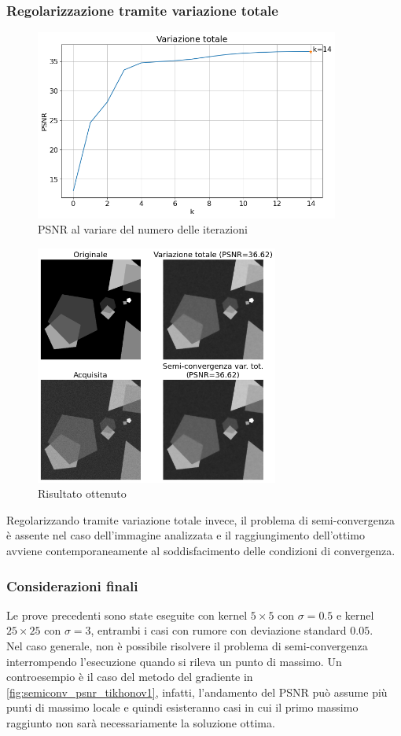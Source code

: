 \documentclass[11pt]{article}
\begin{document}
\subsubsection{Regolarizzazione tramite variazione totale}
\begin{figure}[H]
    \centering
    \includegraphics[width=10cm]{semiconvergenza/1/psnr_tv.png}
    \caption{PSNR al variare del numero delle iterazioni}
    \label{fig:semiconv_psnr_tv1}
\end{figure}
\begin{figure}[H]
    \centering
    \includegraphics[width=8cm]{semiconvergenza/1/deblur_tv.png}
    \caption{Risultato ottenuto}
    \label{fig:semiconv_deblur_tv1}
\end{figure}
Regolarizzando tramite variazione totale invece, il problema di semi-convergenza è assente nel caso dell'immagine analizzata e il raggiungimento dell'ottimo avviene contemporaneamente al soddisfacimento delle condizioni di convergenza.

\subsubsection{Considerazioni finali}
Le prove precedenti sono state eseguite con kernel $5 \times 5$ con $\sigma=0.5$ e kernel $25 \times 25$ con $\sigma=3$, entrambi i casi con rumore con deviazione standard $0.05$.\\
Nel caso generale, non è possibile risolvere il problema di semi-convergenza interrompendo l'esecuzione quando si rileva un punto di massimo. 
Un controesempio è il caso del metodo del gradiente in \autoref{fig:semiconv_psnr_tikhonov1}, infatti, l'andamento del PSNR può assume più punti di massimo locale e quindi esisteranno casi in cui il primo massimo raggiunto non sarà necessariamente la soluzione ottima.
\end{document}
